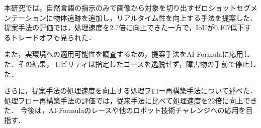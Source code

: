 
本研究では，自然言語の指示のみで画像から対象を切り出すゼロショットセグメンテーションに物体追跡を追加し，リアルタイム性を向上する手法を提案した．提案手法の評価では，処理速度を2.7倍に向上できた一方で，IoUが0.107低下するトレードオフも見られた．

また，実環境への適用可能性を調査するため，提案手法をAI-Formulaに応用した．その結果，モビリティは指定したコースを逸脱せず，障害物の手前で停止した．

さらに，提案手法の処理速度を向上する処理フロー再構築手法について述べた．処理フロー再構築手法の評価では，従来手法に比べて処理速度を22倍に向上できた．
今後は，AI-Formulaのレースや他のロボット技術チャレンジへの応用を目指す．

\newpage
